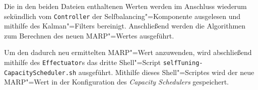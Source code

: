 Die in den beiden Dateien enthaltenen Werten werden im Anschluss wiederum sekündlich vom \texttt{Controller} der Selfbalancing"=Komponente ausgelesen und mithilfe des Kalman"=Filters bereinigt.
Anschließend werden die Algorithmen \cite{Zhang2016} zum Berechnen des neuen \gls{MARP}"=Wertes ausgeführt.

Um den dadurch neu ermittelten \gls{MARP}"=Wert anzuwenden, wird abschließend mithilfe des \texttt{Effectuator}s das dritte Shell"=Script \texttt{selfTuning-CapacityScheduler.sh} ausgeführt.
Mithilfe dieses Shell"=Scriptes wird der neue MARP"=Wert in der Konfiguration des \emph{Capacity Schedulers} gespeichert.
